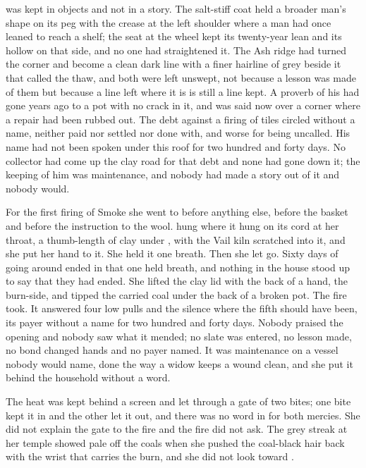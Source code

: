  was kept in objects and not in a story. The salt-stiff coat held a broader man's shape on its peg with the crease at the left shoulder where a man had once leaned to reach a shelf; the seat at the wheel kept its twenty-year lean and its hollow on that side, and no one had straightened it. The Ash ridge had turned the corner and become a clean dark line with a finer hairline of grey beside it that  called the thaw, and both were left unswept, not because a lesson was made of them but because a line left where it is is still a line kept. A proverb of his had gone years ago to a pot with no crack in it, and was said now over a corner where a repair had been rubbed out. The debt against a firing of tiles circled without a name, neither paid nor settled nor done with, and worse for being uncalled. His name had not been spoken under this roof for two hundred and forty days. No collector had come up the clay road for that debt and none had gone down it; the keeping of him was maintenance, and nobody had made a story out of it and nobody would.

For the first firing of Smoke she went to  before anything else, before the basket and before the instruction to the wool.  hung where it hung on its cord at her throat, a thumb-length of clay under , with the Vail kiln scratched into it, and she put her hand to it. She held it one breath. Then she let go. Sixty days of going around ended in that one held breath, and nothing in the house stood up to say that they had ended. She lifted the clay lid with the back of a hand, the burn-side, and tipped the carried coal under the back of a broken pot. The fire took. It answered four low pulls and the silence where the fifth should have been, its payer without a name for two hundred and forty days. Nobody praised the opening and nobody saw what it mended; no slate was entered, no lesson made, no bond changed hands and no payer named. It was maintenance on a vessel nobody would name, done the way a widow keeps a wound clean, and she put it behind the household without a word.

The heat was kept behind a screen and let through a gate of two bites; one bite kept it in and the other let it out, and there was no word in  for both mercies. She did not explain the gate to the fire and the fire did not ask. The grey streak at her temple showed pale off the coals when she pushed the coal-black hair back with the wrist that carries the burn, and she did not look toward .


